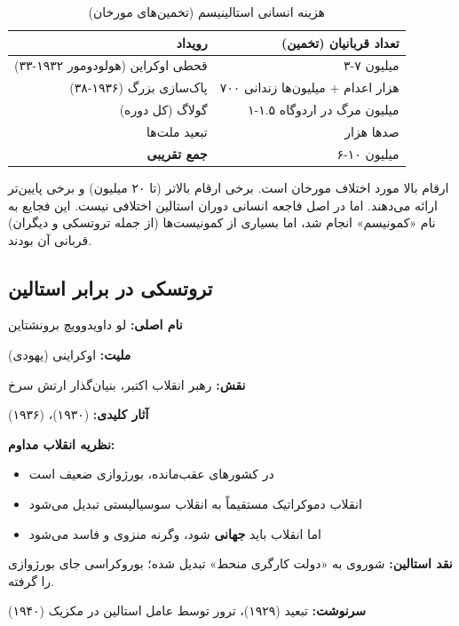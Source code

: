 \begin{table}[htbp]
\centering
\caption{هزینه انسانی استالینیسم (تخمین‌های مورخان)}
\label{tab:stalin-victims}
\begin{tabular}{r|r}
\toprule
\textbf{رویداد} & \textbf{تعداد قربانیان (تخمین)} \\
\midrule
قحطی اوکراین (هولودومور ۱۹۳۲-۳۳) & ۳-۷ میلیون \\
پاک‌سازی بزرگ (۱۹۳۶-۳۸) & ۷۰۰ هزار اعدام + میلیون‌ها زندانی \\
گولاگ (کل دوره) & ۱-۱.۵ میلیون مرگ در اردوگاه \\
تبعید ملت‌ها & صدها هزار \\
\midrule
\textbf{جمع تقریبی} & ۶-۱۰ میلیون \\
\bottomrule
\end{tabular}
\end{table}

\begin{warningbox}
ارقام بالا مورد اختلاف مورخان است. برخی ارقام بالاتر (تا ۲۰ میلیون) و برخی پایین‌تر ارائه می‌دهند. اما در اصل فاجعه انسانی دوران استالین اختلافی نیست. این فجایع به نام «کمونیسم» انجام شد، اما بسیاری از کمونیست‌ها (از جمله تروتسکی و دیگران) قربانی آن بودند.
\end{warningbox}

\subsection{تروتسکی در برابر استالین}

\begin{personbox}

\textbf{نام اصلی:} لو داویدوویچ برونشتاین

\textbf{ملیت:} اوکراینی (یهودی)

\textbf{نقش:} رهبر انقلاب اکتبر، بنیان‌گذار ارتش سرخ

\textbf{آثار کلیدی:}  (۱۹۳۰)،  (۱۹۳۶)

\mediumspace

\textbf{نظریه انقلاب مداوم:}
\begin{itemize}[nosep]
    \item در کشورهای عقب‌مانده، بورژوازی ضعیف است
    \item انقلاب دموکراتیک مستقیماً به انقلاب سوسیالیستی تبدیل می‌شود
    \item اما انقلاب باید \textbf{جهانی} شود، وگرنه منزوی و فاسد می‌شود
\end{itemize}

\mediumspace

\textbf{نقد استالین:} شوروی به «دولت کارگری منحط» تبدیل شده؛ بوروکراسی جای بورژوازی را گرفته.

\mediumspace

\textbf{سرنوشت:} تبعید (۱۹۲۹)، ترور توسط عامل استالین در مکزیک (۱۹۴۰)
\end{personbox}


